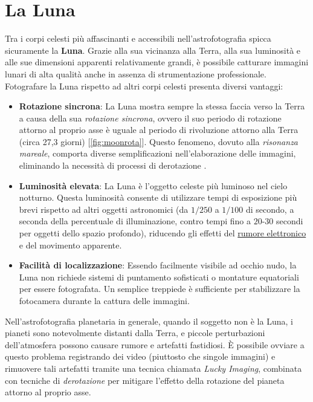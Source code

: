 \section{La Luna} \label{sec:moon}

Tra i corpi celesti più affascinanti e accessibili nell'astrofotografia spicca sicuramente la \textbf{Luna}. Grazie alla sua vicinanza alla Terra, alla sua luminosità e alle sue dimensioni apparenti relativamente grandi, è possibile catturare immagini lunari di alta qualità anche in assenza di strumentazione professionale. Fotografare la Luna rispetto ad altri corpi celesti presenta diversi vantaggi:

\begin{itemize}
    \item \textbf{Rotazione sincrona}: La Luna mostra sempre la stessa faccia verso la Terra a causa della sua \textit{rotazione sincrona}, ovvero il suo periodo di rotazione attorno al proprio asse è uguale al periodo di rivoluzione attorno alla Terra (circa 27,3 giorni) [\cref{fig:moonrota}]. Questo fenomeno, dovuto alla \textit{risonanza mareale}, comporta diverse semplificazioni nell'elaborazione delle immagini, eliminando la necessità di processi di derotazione \cite{nasa_moon_orbit}.
    
    \item \textbf{Luminosità elevata}: La Luna è l'oggetto celeste più luminoso nel cielo notturno. Questa luminosità consente di utilizzare tempi di esposizione più brevi rispetto ad altri oggetti astronomici (da $1/250$ a $1/100$ di secondo, a seconda della percentuale di illuminazione, contro tempi fino a $20$-$30$ secondi per oggetti dello spazio profondo), riducendo gli effetti del \hyperref[sec:noise]{rumore elettronico} e del movimento apparente.
    
    \item \textbf{Facilità di localizzazione}: Essendo facilmente visibile ad occhio nudo, la Luna non richiede sistemi di puntamento sofisticati o montature equatoriali per essere fotografata. Un semplice treppiede è sufficiente per stabilizzare la fotocamera durante la cattura delle immagini.
\end{itemize}

Nell'astrofotografia planetaria in generale, quando il soggetto non è la Luna, i pianeti sono notevolmente distanti dalla Terra, e piccole perturbazioni dell'atmosfera possono causare rumore e artefatti fastidiosi. È possibile ovviare a questo problema registrando dei video (piuttosto che singole immagini) e rimuovere tali artefatti tramite una tecnica chiamata \textit{Lucky Imaging}, combinata con tecniche di \textit{derotazione} per mitigare l'effetto della rotazione del pianeta attorno al proprio asse.

